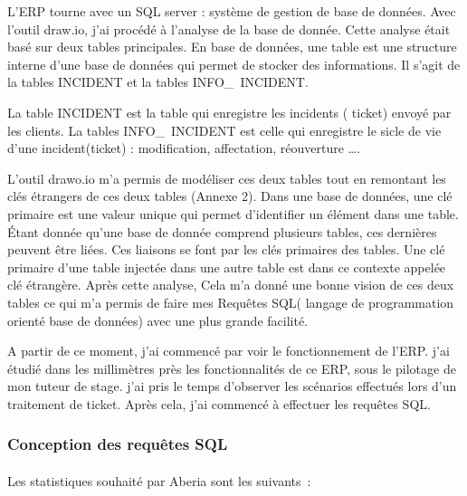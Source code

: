 \documentclass[a4paper,12pt]{report}
\begin{document}
               L’ERP tourne avec  un SQL server : système  de gestion de base de données. 
               Avec  l’outil  draw.io, j’ai procédé à l’analyse de la base de donnée. Cette analyse était basé sur deux tables principales. En base de données, une table est une structure interne d’une base de données qui permet de stocker des informations. Il s’agit de la  tables INCIDENT et la tables INFO\_\ INCIDENT.\newline 
               
               La table INCIDENT est la table qui enregistre les incidents ( ticket) envoyé par les clients. La tables INFO\_\ INCIDENT est celle qui enregistre le sicle de vie d’une incident(ticket) : modification, affectation, réouverture …. \newline
               
               L’outil drawo.io m’a permis de modéliser ces deux tables tout en remontant les clés étrangers de ces deux tables (Annexe 2). Dans une base de données, une clé primaire est une valeur unique qui permet d'identifier un élément dans une table. Étant donnée  qu’une base de donnée comprend plusieurs tables, ces dernières peuvent être liées. Ces liaisons se font par les clés primaires des tables. Une clé primaire d’une table injectée dans une autre table est dans ce contexte appelée clé étrangère. 
               Après cette analyse, Cela m’a donné une bonne vision de ces deux tables ce qui  m’a permis de faire mes Requêtes SQL( langage de programmation orienté base de données)  avec une plus grande facilité.\newline 
               
               A partir de ce moment, j’ai commencé par voir le fonctionnement de l’ERP. j’ai étudié dans les millimètres près les fonctionnalités de ce ERP, sous le pilotage de mon tuteur de stage. j’ai pris le temps d’observer les scénarios effectués lors d’un traitement de ticket. Après cela, j’ai commencé à effectuer les requêtes SQL.
                     
\subsubsection{Conception des requêtes SQL}

\paragraph*{}

Les statistiques souhaité par Aberia sont les suivants :\newline 
\end{document}
